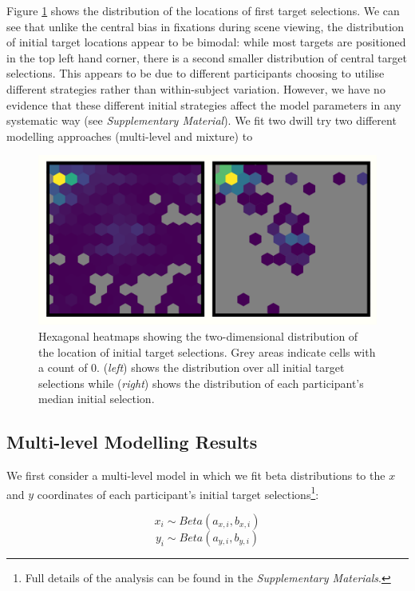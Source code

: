 \documentclass[vision,article,submit,pdftex,moreauthors]{Definitions/mdpi}
\begin{document}
Figure \ref{fig:qjep_init_sel_hex} shows the distribution of the locations of first target selections. We can see that unlike the central bias in fixations during scene viewing, the distribution of initial target locations appear to be bimodal: while most targets are positioned in the top left hand corner, there is a second smaller distribution of central target selections. This appears to be due to different participants choosing to utilise different strategies rather than within-subject variation. However, we have no evidence that these different initial strategies affect the model parameters in any systematic way (see \textit{Supplementary Material}). We fit two dwill try two different modelling approaches (multi-level and mixture) to  

\begin{figure}[H]
\centering
\includegraphics[width=12 cm]{Figures/init_sel_hex_plot.pdf}
\caption{Hexagonal heatmaps showing the two-dimensional distribution of the location of initial target selections. Grey areas indicate cells with a count of 0. (\textit{left}) shows the distribution over all initial target selections while (\textit{right}) shows the distribution of each participant's median initial selection. }
\label{fig:qjep_init_sel_hex}
\end{figure} 

\subsection{Multi-level Modelling Results}

We first consider a multi-level model in which we fit beta distributions to the $x$ and $y$ coordinates of each participant's initial target selections\footnote{Full details of the analysis can be found in the \textit{Supplementary Materials}.}:

\begin{equation}
    x_i \sim Beta(a_{x,i}, b_{x,i})
    \label{eq:beta1x}
\end{equation}
\begin{equation}
    y_i \sim Beta(a_{y,i}, b_{y,i})
    \label{eq:beta1y}
\end{equation}
\end{document}
